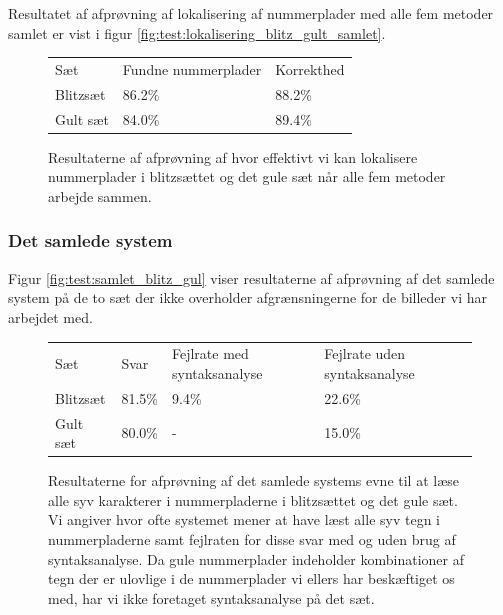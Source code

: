 Resultatet af afprøvning af lokalisering af nummerplader med alle fem metoder samlet er vist i figur \vref{fig:test:lokalisering_blitz_gult_samlet}.

\begin{figure}[htp]
\centering
  \begin{tabular}{|l|l|l|}
    \hline
    \rowcolor[gray]{0.9} \multicolumn{3}{|>{\columncolor[gray]{0.9}}c|}{\textbf{Samlet metode til lokalisering}} \\
    \hline
    Sæt      & Fundne nummerplader & Korrekthed\\ \hline
    Blitzsæt &  86.2\%             & 88.2\% \\ \hline
    Gult sæt  &  84.0\%             & 89.4\% \\ \hline
  \end{tabular}
\caption{Resultaterne af afprøvning af hvor effektivt vi kan lokalisere nummerplader i blitzsættet og det gule sæt når alle fem metoder arbejde sammen.}
\label{fig:test:lokalisering_blitz_gult_samlet}
\end{figure}


\subsubsection{Det samlede system}
Figur \vref{fig:test:samlet_blitz_gul} viser resultaterne af afprøvning af det samlede system på de to sæt der ikke overholder afgrænsningerne for de billeder vi har arbejdet med.

\begin{figure}[htp]
\centering
\begin{tabular}{|l|l|p{2.5cm}|p{2.5cm}|}\hline
\rowcolor[gray]{0.9} \multicolumn{4}{|>{\columncolor[gray]{0.9}}c|}{\textbf{Samlet system}} \\ \hline
Sæt      & Svar   & Fejlrate med syntaksanalyse & Fejlrate uden syntaksanalyse \\ \hline
Blitzsæt & 81.5\% & 9.4\%                      & 22.6\%                      \\ \hline
Gult sæt & 80.0\% & -                          & 15.0\%                      \\ \hline
\end{tabular}
\caption{Resultaterne for afprøvning af det samlede systems evne til at læse alle syv karakterer i nummerpladerne i blitzsættet og det gule sæt. Vi angiver hvor ofte systemet mener at have læst alle syv tegn i nummerpladerne samt fejlraten for disse svar med og uden brug af syntaksanalyse. Da gule nummerplader indeholder kombinationer af tegn der er ulovlige i de nummerplader vi ellers har beskæftiget os med, har vi ikke foretaget syntaksanalyse på det sæt.}
\label{fig:test:samlet_blitz_gul}
\end{figure}

